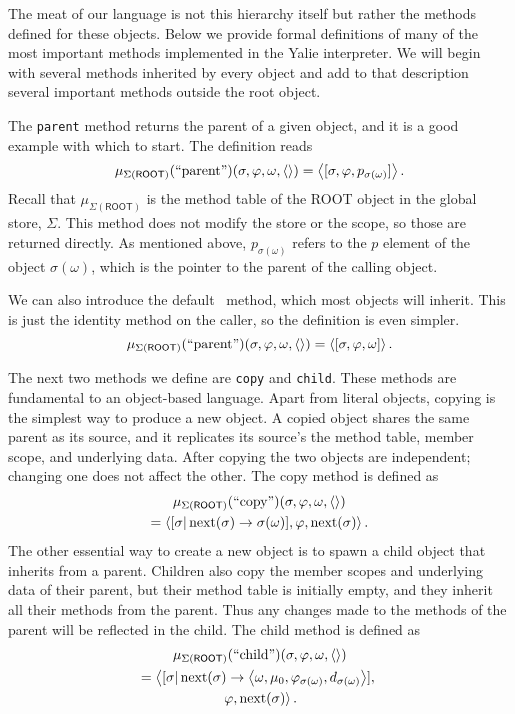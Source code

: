 \documentclass[twocolumn]{article}
\begin{document}
The meat of our language is not this hierarchy itself but rather the
methods defined for these objects. Below we provide formal definitions
of many of the most important methods implemented in the Yalie
interpreter. We will begin with several methods inherited by every
object and add to that description several important methods outside
the root object.

The \texttt{parent} method returns the parent of a given object, and
it is a good example with which to start. The definition reads
\[ \mu_{\Sigma(\mathsf{ROOT})}(\text{``parent''})(\sigma,\varphi,\omega,
\left<\right>) = \left< [\sigma,\varphi,p_{\sigma(\omega)}] \right>. \] Recall that
$\mu_{\Sigma(\mathsf{ROOT})}$ is the method table of the \textsf{ROOT}
object in the global store, $\Sigma$. This method does not modify the
store or the scope, so those are returned directly. As mentioned
above, $p_{\sigma(\omega)}$ refers to the $p$ element of the object
$\sigma(\omega)$, which is the pointer to the parent of the calling
object.

We can also introduce the default \eval\ method, which most objects
will inherit. This is just the identity method on the caller, so the
definition is even simpler.
\[ \mu_{\Sigma(\mathsf{ROOT})}(\text{``parent''})(\sigma,\varphi,\omega,
\left<\right>) = \left< [\sigma,\varphi,\omega] \right>. \]

The next two methods we define are \texttt{copy} and
\texttt{child}. These methods are fundamental to an object-based
language. Apart from literal objects, copying is the simplest way to
produce a new object. A copied object shares the same parent as its
source, and it replicates its source's the method table, member scope,
and underlying data. After copying the two objects are independent;
changing one does not affect the other. The copy method is defined as
\begin{multline*}
  \mu_{\Sigma(\mathsf{ROOT})}(\text{``copy''})(\sigma,\varphi,\omega,
\left<\right>) \\ = \left< [\sigma|\operatorname{next}(\sigma)\rightarrow\sigma(\omega)],\varphi,
\operatorname{next}(\sigma)\right>.
\end{multline*}
The other essential way to create a new object is to spawn a child
object that inherits from a parent. Children also copy the member
scopes and underlying data of their parent, but their method table is
initially empty, and they inherit all their methods from the
parent. Thus any changes made to the methods of the parent will be
reflected in the child. The child method is defined as
\begin{multline*}
  \mu_{\Sigma(\mathsf{ROOT})}(\text{``child''})(\sigma,\varphi,\omega,
  \left<\right>) \\ = \left< [\sigma|\operatorname{next}(\sigma)\rightarrow \left< \omega, \mu_0,
  \varphi_{\sigma(\omega)}, d_{\sigma(\omega)}\right>],\right.\\\left.\varphi,
  \operatorname{next}(\sigma)\right>.
\end{multline*}
\end{document}
